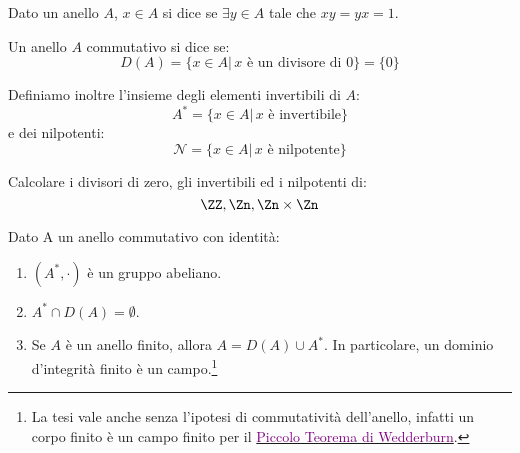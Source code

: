 \documentclass[11pt]{scrartcl}
\begin{document}
\begin{definition}
    Dato un anello $A$, $x \in A$ si dice  se $\exists y \in A$ tale che $xy=yx=1$.
\end{definition}

\begin{definition}
    Un anello $A$ commutativo si dice  se:
        \[ D(A) = \{x \in A |\, \text{$x$ è un divisore di $0$}\} = \{0\}
            \]
\end{definition}

Definiamo inoltre l'insieme degli elementi invertibili di $A$:
    \[ A^* = \{x \in A |\, \text{$x$ è invertibile}\}
        \]
e dei nilpotenti:
    \[ \mathcal{N} = \{x \in A |\, \text{$x$ è nilpotente}\} 
        \]

\begin{exercise}
    Calcolare i divisori di zero, gli invertibili ed i nilpotenti di:
        \[ \ZZ, \Zn, \Zn \times \Zn
            \]
\end{exercise}

\begin{soln}
    
\end{soln}

\begin{proposition}
    Dato A un anello commutativo con identità:
    \begin{enumerate}[(1)]
        \item $(A^*,\cdot)$ è un gruppo abeliano.
        \item $A^* \cap D(A) = \emptyset$.
        \item Se $A$ è un anello finito, allora $A = D(A) \cup A^*$. In particolare, un dominio
            d'integrità finito è un campo.\footnote{La tesi vale anche senza l'ipotesi di commutatività
            dell'anello, infatti un corpo finito è un campo finito per il \href{https://en.wikipedia.org/wiki/Wedderburn\%27s_little_theorem}{\textcolor{purple}{Piccolo Teorema di Wedderburn}}.}
    \end{enumerate}
\end{proposition}
\end{document}
